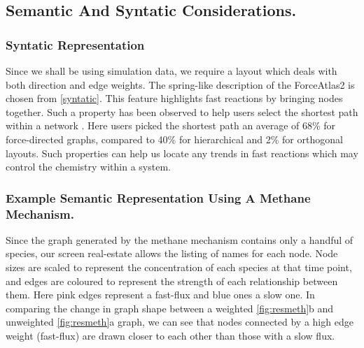 \subsection{Semantic And Syntatic Considerations.}

\subsubsection{Syntatic Representation}
Since we shall be using simulation data, we require a layout which deals with both direction and edge weights. The spring-like description of the  ForceAtlas2 is chosen from \autoref{syntatic}. This feature highlights fast reactions by bringing nodes together. Such a property has been observed to help users select the shortest path within a network \citep{eyetrack}. Here users picked the shortest path an average of 68\% for force-directed graphs, compared to 40\% for hierarchical and 2\% for orthogonal layouts. Such properties can help us locate any trends in fast reactions which may control the chemistry within a system.


\subsubsection{Example Semantic Representation Using A Methane Mechanism.}
Since the graph generated by the methane mechanism contains only a handful of species, our screen real-estate allows the listing of names for each node. Node sizes are scaled to represent the concentration of each species at that time point, and edges are coloured to represent the strength of each relationship between them. Here pink edges represent a fast-flux and blue ones a slow one. In comparing the change in graph shape between a weighted \autoref{fig:resmeth}b and unweighted \autoref{fig:resmeth}a graph, we can see that nodes connected by a high edge weight (fast-flux) are drawn closer to each other than those with a slow flux.


